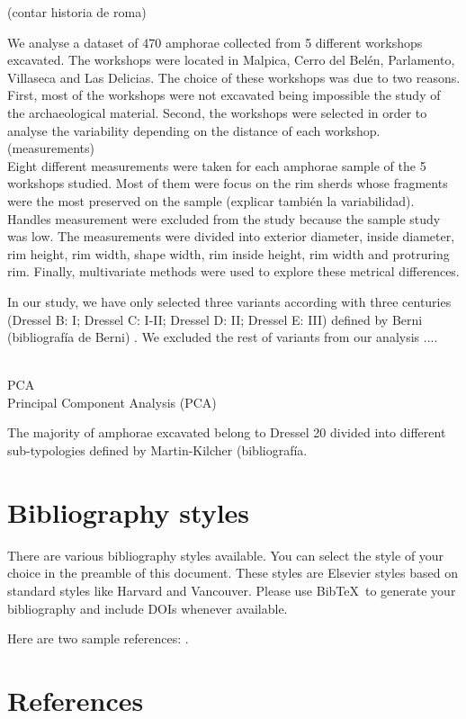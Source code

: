 \documentclass[review]{elsarticle}
\begin{document}
(contar historia de roma)


We analyse a dataset of 470 amphorae collected from 5 different workshops excavated. 
The workshops were located in Malpica, Cerro del Belén, Parlamento, Villaseca and Las Delicias. The choice of these workshops was due to two reasons. First, most of the workshops were not excavated being impossible the study of the archaeological material. Second, the workshops were selected in order to  analyse the variability depending on the distance of each workshop. 
\\
(measurements)
\\
Eight different measurements were taken for each amphorae sample of the 5 workshops studied. Most of them were focus on the rim sherds whose fragments were the most preserved on the sample (explicar también la variabilidad). Handles measurement were excluded from the study because the sample study was low. The measurements were divided into exterior diameter, inside diameter, rim height, rim width, shape width, rim inside height, rim width and protruring rim. Finally, multivariate methods were used to explore these metrical differences. 

In our study, we have only selected three variants according with three centuries (Dressel B: I; Dressel C: I-II; Dressel D: II; Dressel E: III) defined by Berni (bibliografía de Berni) . We excluded the rest of variants from our analysis ....

\\
PCA 
\\
Principal Component Analysis (PCA)










The majority of amphorae excavated belong to Dressel 20 divided into different sub-typologies defined by Martin-Kilcher (bibliografía. 








\section{Bibliography styles}

There are various bibliography styles available. You can select the style of your choice in the preamble of this document. These styles are Elsevier styles based on standard styles like Harvard and Vancouver. Please use Bib\TeX\ to generate your bibliography and include DOIs whenever available.

Here are two sample references: \cite{Feynman1963118,Dirac1953888}.

\section*{References}


\end{document}
